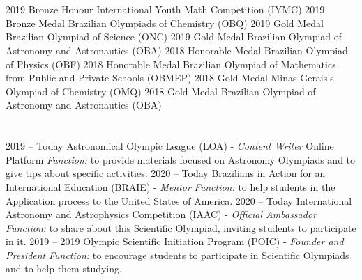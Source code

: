 \documentclass{cv}
\begin{document}
    \section*{}
        \begin{entrylist}
            \entry
                {2019}
                {Bronze Honour}
                {}
                {International Youth Math Competition (IYMC)}
            \entry
                {2019}
                {Bronze Medal}
                {}
                {Brazilian Olympiads of Chemistry (OBQ)}
            \entry
                {2019}
                {Gold Medal}
                {}
                {Brazilian Olympiad of Science (ONC)}
            \entry
                {2019}
                {Gold Medal}
                {}
                {Brazilian Olympiad of Astronomy and Astronautics (OBA)}
            \entry
                {2018}
                {Honorable Medal}
                {}
                {Brazilian Olympiad of Physics (OBF)}
            \entry
                {2018}
                {Honorable Medal}
                {}
                {Brazilian Olympiad of Mathematics from Public and Private Schools (OBMEP)}
            \entry
                {2018}
                {Gold Medal}
                {}
                {Minas Gerais's Olympiad of Chemistry (OMQ)}
            \entry
                {2018}
                {Gold Medal}
                {}
                {Brazilian Olympiad of Astronomy and Astronautics (OBA)}
        \end{entrylist}
    \section*{}
        \begin{entrylist}
            \entry
                {2019 -- Today}
                {Astronomical Olympic League (LOA) - \textit{Content Writer}}
                {Online Platform}
                {\textit{Function:} to provide materials focused on Astronomy Olympiads and to give tips about specific activities.}
            \entry 
                {2020 -- Today}
                {Brazilians in Action for an International Education (BRAIE) - \textit{Mentor}}
                {}
                {\textit{Function:} to help students in the Application process to the United States of America.}
            \entry
                {2020 -- Today}
                {International Astronomy and Astrophysics Competition (IAAC) - \textit{Official Ambassador}}
                {}
                {\textit{Function:} to share about this Scientific Olympiad, inviting students to participate in it.}
            \entry
                {2019 -- 2019}
                {Olympic Scientific Initiation Program (POIC) - {\textit{Founder and President}}}
                {}
                {\textit{Function:} to encourage students to participate in Scientific Olympiads and to help them studying.}
        \end{entrylist}
\end{document}
